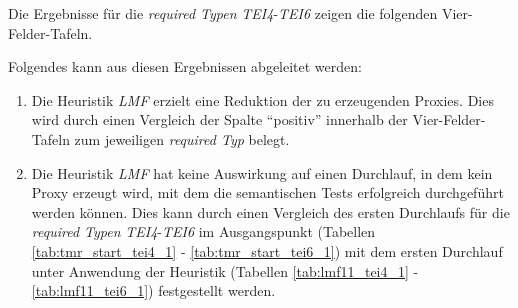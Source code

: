 \noindent
Die Ergebnisse für die \emph{required Typen} \emph{TEI4}-\emph{TEI6} zeigen die folgenden Vier-Felder-Tafeln. 
\begin{multicols}{3}
\columnbreak
{}\columnbreak
{}
\end{multicols}
\begin{multicols}{3}
\columnbreak
{}\columnbreak
{}
\end{multicols}
\noindent
Folgendes kann aus diesen Ergebnissen abgeleitet werden:
\begin{enumerate}
\item Die Heuristik \emph{LMF} erzielt eine Reduktion der zu erzeugenden Proxies. Dies wird durch einen Vergleich der Spalte ``positiv'' innerhalb der Vier-Felder-Tafeln zum jeweiligen \emph{required Typ} belegt.

\item Die Heuristik \emph{LMF} hat keine Auswirkung auf einen Durchlauf, in dem kein Proxy erzeugt wird, mit dem die semantischen Tests erfolgreich durchgeführt werden können. Dies kann durch einen Vergleich des ersten Durchlaufs für die \emph{required Typen} \emph{TEI4}-\emph{TEI6} im Ausgangspunkt (Tabellen \ref{tab:tmr_start_tei4_1} - \ref{tab:tmr_start_tei6_1}) mit dem ersten Durchlauf unter Anwendung der Heuristik (Tabellen \ref{tab:lmf11_tei4_1} - \ref{tab:lmf11_tei6_1}) festgestellt werden.
\end{enumerate}




